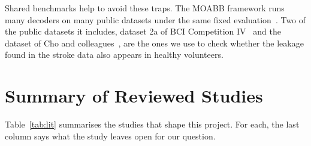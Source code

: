 Shared benchmarks help to avoid these traps. The MOABB framework runs many decoders on many
public datasets under the same fixed evaluation~\cite{jayaram2018moabb,chevallier2024moabb}.
Two of the public datasets it includes, dataset 2a of BCI Competition IV~\cite{tangermann2012}
and the dataset of Cho and colleagues~\cite{cho2017}, are the ones we use to check whether
the leakage found in the stroke data also appears in healthy volunteers.

\section{Summary of Reviewed Studies}\label{sec:lit-summary}

Table~\ref{tab:lit} summarises the studies that shape this project. For each, the last
column says what the study leaves open for our question.

